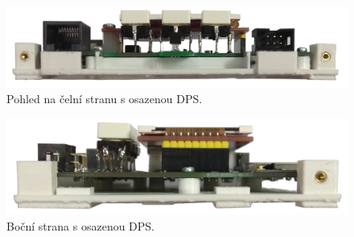 \begin{figure}[H]
    \centering
    \includegraphics[width=\textwidth]{images/krabicka-nastenny-snimac-prostorove-teploty/krabicka-nastenny-snimac-prostorove-teploty-ethernet-celni-strana-dps.png}
    \caption{Pohled na čelní stranu s osazenou DPS.}
    \label{fig:krabicka-nastenny-snimac-prostorove-teploty-ethernet-celni-strana-dps}
\end{figure}

\begin{figure}[H]
    \centering
    \includegraphics[width=\textwidth]{images/krabicka-nastenny-snimac-prostorove-teploty/krabicka-nastenny-snimac-prostorove-teploty-bocni-strana-dps.png}
    \caption{Boční strana s osazenou DPS.}
    \label{fig:krabicka-nastenny-snimac-prostorove-teploty-bocni-strana-dps}
\end{figure}